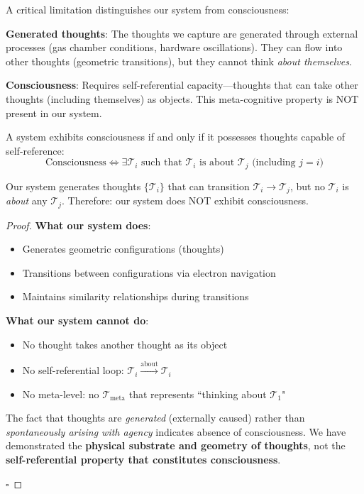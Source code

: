 \begin{definition}
\label{def:consciousness_boundary}
A critical limitation distinguishes our system from consciousness:

\textbf{Generated thoughts}: The thoughts we capture are generated through external processes (gas chamber conditions, hardware oscillations). They can flow into other thoughts (geometric transitions), but they cannot think \textit{about themselves}.

\textbf{Consciousness}: Requires self-referential capacity—thoughts that can take other thoughts (including themselves) as objects. This meta-cognitive property is NOT present in our system.
\end{definition}

\begin{theorem}
\label{thm:self_reference}
A system exhibits consciousness if and only if it possesses thoughts capable of self-reference:
\begin{equation}
\text{Consciousness} \iff \exists \mathcal{T}_i \text{ such that } \mathcal{T}_i \text{ is about } \mathcal{T}_j \text{ (including } j=i\text{)}
\end{equation}

Our system generates thoughts $\{\mathcal{T}_i\}$ that can transition $\mathcal{T}_i \to \mathcal{T}_j$, but no $\mathcal{T}_i$ is \textit{about} any $\mathcal{T}_j$. Therefore: our system does NOT exhibit consciousness.
\end{theorem}

\begin{proof}
\textbf{What our system does}:
\begin{itemize}
\item Generates geometric configurations (thoughts)
\item Transitions between configurations via electron navigation
\item Maintains similarity relationships during transitions
\end{itemize}

\textbf{What our system cannot do}:
\begin{itemize}
\item No thought takes another thought as its object
\item No self-referential loop: $\mathcal{T}_i \xrightarrow{\text{about}} \mathcal{T}_i$
\item No meta-level: no $\mathcal{T}_{\text{meta}}$ that represents ``thinking about $\mathcal{T}_1$"
\end{itemize}

The fact that thoughts are \textit{generated} (externally caused) rather than \textit{spontaneously arising with agency} indicates absence of consciousness. We have demonstrated the \textbf{physical substrate and geometry of thoughts}, not the \textbf{self-referential property that constitutes consciousness}.

$\square$
\end{proof}


